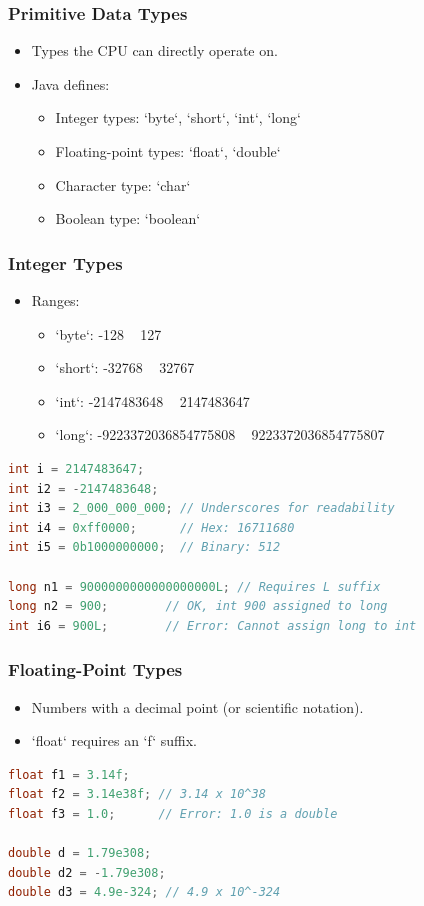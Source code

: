 \documentclass[serif, aspectratio=169]{beamer}
\begin{document}
\begin{frame}[fragile]
\frametitle{Primitive Data Types}
\begin{itemize}
    \item Types the CPU can directly operate on.
    \item Java defines:
    \begin{itemize}
        \item Integer types: `byte`, `short`, `int`, `long`
        \item Floating-point types: `float`, `double`
        \item Character type: `char`
        \item Boolean type: `boolean`
    \end{itemize}
\end{itemize}
\begin{center}
\end{center}
\end{frame}

\begin{frame}[fragile]
\frametitle{Integer Types}
\begin{itemize}
    \item Ranges:
    \begin{itemize}
        \item `byte`: -128 ~ 127
        \item `short`: -32768 ~ 32767
        \item `int`: -2147483648 ~ 2147483647
        \item `long`: -9223372036854775808 ~ 9223372036854775807
    \end{itemize}
\end{itemize}
\begin{lstlisting}[language=Java]
int i = 2147483647;
int i2 = -2147483648;
int i3 = 2_000_000_000; // Underscores for readability
int i4 = 0xff0000;      // Hex: 16711680
int i5 = 0b1000000000;  // Binary: 512

long n1 = 9000000000000000000L; // Requires L suffix
long n2 = 900;        // OK, int 900 assigned to long
int i6 = 900L;        // Error: Cannot assign long to int
\end{lstlisting}
\end{frame}

\begin{frame}[fragile]
\frametitle{Floating-Point Types}
\begin{itemize}
    \item Numbers with a decimal point (or scientific notation).
    \item `float` requires an `f` suffix.
\end{itemize}
\begin{lstlisting}[language=Java]
float f1 = 3.14f;
float f2 = 3.14e38f; // 3.14 x 10^38
float f3 = 1.0;      // Error: 1.0 is a double

double d = 1.79e308;
double d2 = -1.79e308;
double d3 = 4.9e-324; // 4.9 x 10^-324
\end{lstlisting}
\end{frame}
\end{document}
